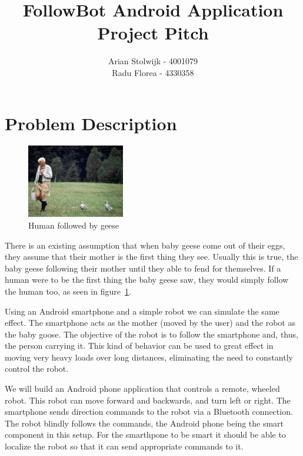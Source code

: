 \documentclass[a4paper,10pt]{article}
\title{FollowBot Android Application\\Project Pitch}
\author{Arian Stolwijk - 4001079\\Radu Florea - 4330358}
\date{}
\begin{document}
\maketitle

\section{Problem Description}

\begin{figure}
  \vspace{-30pt}
  \begin{center}
    \includegraphics[width=0.38\textwidth]{geese.jpg}
    \vspace{-20pt}
  \end{center}
  \caption{Human followed by geese}
\label{fig:geese}
\end{figure}

There is an existing assumption that when baby geese come out of their eggs, they assume that their mother is the first
thing they see. Usually this is true, the baby geese following their mother until they able to fend for themselves. If a human were to be the first thing the baby geese saw, they would simply follow the human too, as seen in figure~\ref{fig:geese}.

Using an Android smartphone and a simple robot we can simulate the same effect. The smartphone acts as the mother (moved by the user) and the robot as the baby goose. The objective of the robot is to follow the smartphone and, thus, the person carrying it. This kind of behavior can be used to great effect in moving very heavy loads over long distances, eliminating the need to constantly control the robot.

We will build an Android phone application that controls a remote, wheeled robot. This robot can move forward and backwards, and turn left or right. The smartphone sends direction commands to the robot via a Bluetooth connection. The robot blindly follows the commands, the Android phone being the smart component in this setup. For the smarthpone to be smart it should be able to localize the robot so that it can send appropriate commands to it.
\end{document}
